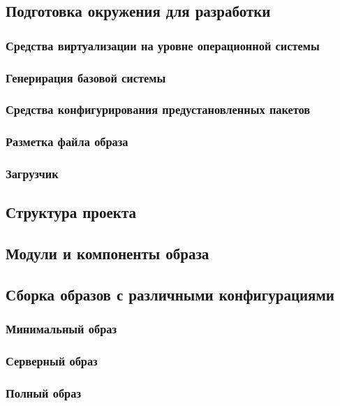\subsection{Подготовка окружения для разработки}
\newpage
\subsubsection{Средства виртуализации на уровне операционной системы}
\newpage
\subsubsection{Генерирация базовой системы}
\newpage
\subsubsection{Средства конфигурирования предустановленных пакетов}
\newpage
\subsubsection{Разметка файла образа}
\newpage
\subsubsection{Загрузчик}
\newpage
\subsection{Структура проекта}
\newpage
\subsection{Модули и компоненты образа}
\newpage
\subsection{Сборка образов с различными конфигурациями}
\subsubsection{Минимальный образ}
\subsubsection{Серверный образ}
\subsubsection{Полный образ}
\newpage
